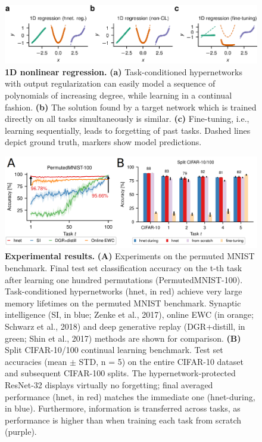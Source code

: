 \documentclass[main]{subfiles}
\begin{document}
%
\begin{figure}[H]
    \centering
    \includegraphics[width=0.95\linewidth]{14_ContinualMetaAndTransferLearning/figures/hypernetwork_toy.png}
    \caption{\textbf{1D nonlinear regression.} \textbf{(a)} Task-conditioned hypernetworks with output regularization can easily model a sequence of polynomials of increasing degree, while learning in a continual fashion. \textbf{(b)} The solution found by a target network which is trained directly on all tasks simultaneously is similar. \textbf{(c)} Fine-tuning, i.e., learning sequentially, leads to forgetting of past tasks. Dashed lines depict ground truth, markers show model predictions.}
    \label{fig:my_label}
\end{figure}
%
\begin{figure}[H]
    \centering
    \includegraphics[width=0.95\linewidth]{14_ContinualMetaAndTransferLearning/figures/hypernetwork_results.png}
    \caption{\textbf{Experimental results.} \textbf{(A)} Experiments on the permuted MNIST benchmark.  Final test set classification accuracy on the t-th task after learning one hundred permutations (PermutedMNIST-100). Task-conditioned hypernetworks (hnet, in red) achieve very large memory lifetimes on the permuted MNIST benchmark. Synaptic intelligence (SI, in blue; Zenke et al., 2017), online EWC (in orange; Schwarz et al., 2018) and deep generative replay (DGR+distill, in green; Shin et al., 2017) methods are shown for comparison. \textbf{(B)} Split CIFAR-10/100 continual learning benchmark. Test set accuracies (mean $\pm$ STD, n = 5) on the entire CIFAR-10 dataset and subsequent CIFAR-100 splits. The hypernetwork-protected ResNet-32 displays virtually no forgetting; final averaged performance (hnet, in red) matches the immediate one (hnet-during, in blue). Furthermore, information is transferred across tasks, as performance is higher than when training each task from scratch (purple).}
    \label{fig:my_label}
\end{figure}
\end{document}
